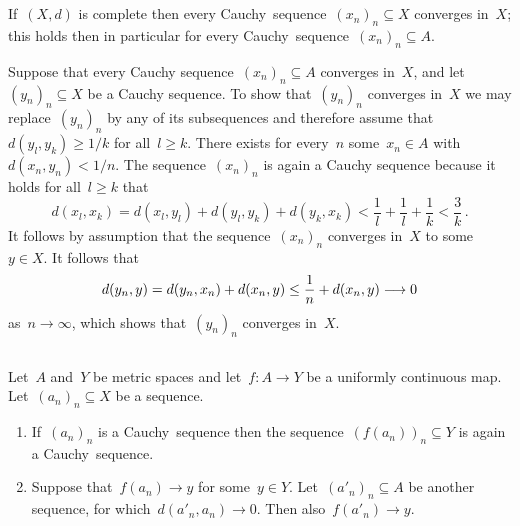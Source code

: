 \section{}





\subsection{}

If~$(X,d)$ is complete then every Cauchy~sequence~$(x_n)_n \subseteq X$ converges in~$X$;
this holds then in particular for every Cauchy~sequence~$(x_n)_n \subseteq A$.

Suppose that every Cauchy sequence~$(x_n)_n \subseteq A$ converges in~$X$, and let~$(y_n)_n \subseteq X$ be a Cauchy sequence.
To show that~$(y_n)_n$ converges in~$X$ we may replace~$(y_n)_n$ by any of its subsequences and therefore assume that~$d(y_l, y_k) \geq 1/k$ for all~$l \geq k$.
There exists for every~$n$ some~$x_n \in A$ with~$d(x_n, y_n) < 1/n$.
The sequence~$(x_n)_n$ is again a Cauchy sequence because it holds for all~$l \geq k$ that
\[
    d(x_l, x_k)
  = d(x_l, y_l) + d(y_l, y_k) + d(y_k, x_k)
  < \frac{1}{l} + \frac{1}{l} + \frac{1}{k}
  < \frac{3}{k} \,.
\]
It follows by assumption that the sequence~$(x_n)_n$ converges in~$X$ to some~$y \in X$.
It follows that
\[
          d(y_n, y)
  =       d(y_n, x_n) + d(x_n, y)
  \leq    \frac{1}{n} + d(x_n, y)
  \longrightarrow 0
\]
as~$n \to \infty$, which shows that~$(y_n)_n$ converges in~$X$.





\subsection{}
\label{extension of uniformly continuous maps}

\begin{lemma}
  \label{uniformly continuous preserves cauchy}
  Let~$A$ and~$Y$ be metric spaces and let~$f \colon A \to Y$ be a uniformly continuous map.
  Let~$(a_n)_n \subseteq X$ be a sequence.
  \begin{enumerate}
    \item
      If~$(a_n)_n$ is a Cauchy~sequence then the sequence~$(f(a_n))_n \subseteq Y$ is again a Cauchy~sequence.
    \item
      Suppose that~$f(a_n) \to y$ for some~$y \in Y$.
      Let~$(a'_n)_n \subseteq A$ be another sequence, for which~$d(a'_n, a_n) \to 0$.
      Then also~$f(a'_n) \to y$.
  \end{enumerate}
\end{lemma}

